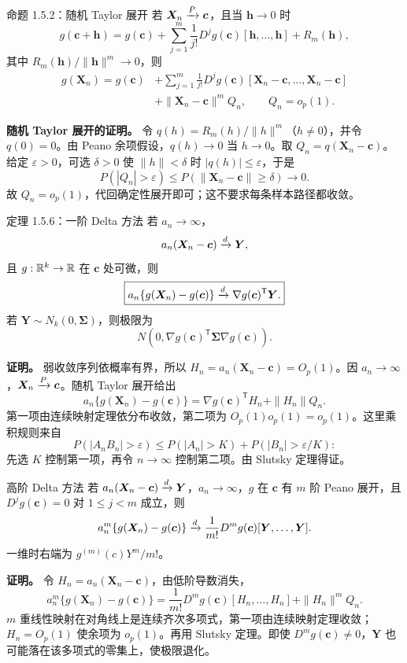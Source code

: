 \begin{definitionbox}{命题 1.5.2：随机 Taylor 展开}
若 $\bm X_n\xrightarrow{P}\bm c$，且当 $\bm h\to0$ 时
\[
 g(\bm c+\bm h)
 =g(\bm c)+\sum_{j=1}^m\frac1{j!}
 D^jg(\bm c)[\bm h,\ldots,\bm h]+R_m(\bm h),
\]
其中 $R_m(\bm h)/\|\bm h\|^m\to0$，则
\[
\begin{aligned}
 g(\bm X_n)=g(\bm c)
 &+\sum_{j=1}^m\frac1{j!}
 D^jg(\bm c)[\bm X_n-\bm c,\ldots,\bm X_n-\bm c]\\
 &+\|\bm X_n-\bm c\|^mQ_n,
 \qquad Q_n=o_p(1).
\end{aligned}
\]
\end{definitionbox}

\textbf{随机 Taylor 展开的证明。} 令 $q(h)=R_m(h)/\|h\|^m$（$h\ne0$），并令 $q(0)=0$。由 Peano 余项假设，$q(h)\to0$ 当 $h\to0$。取 $Q_n=q(\bm X_n-\bm c)$。给定 $\varepsilon>0$，可选 $\delta>0$ 使 $\|h\|<\delta$ 时 $|q(h)|\le\varepsilon$，于是
\[
 P(|Q_n|>\varepsilon)\le P(\|\bm X_n-\bm c\|\ge\delta)\to0.
\]
故 $Q_n=o_p(1)$，代回确定性展开即可；这不要求每条样本路径都收敛。

\begin{definitionbox}{定理 1.5.6：一阶 Delta 方法}
若 $a_n\to\infty$，
\[
 a_n(\bm X_n-\bm c)\xrightarrow{d}\bm Y,
\]
且 $g:\mathbb R^k\to\mathbb R$ 在 $\bm c$ 处可微，则
\[
 \boxed{
 a_n\{g(\bm X_n)-g(\bm c)\}
 \xrightarrow{d} \nabla g(\bm c)^{\mathsf T}\bm Y.}
\]
若 $\bm Y\sim N_k(0,\bm\Sigma)$，则极限为
\[
 N\!\left(0,
 \nabla g(\bm c)^{\mathsf T}
 \bm\Sigma
 \nabla g(\bm c)\right).
\]
\end{definitionbox}

\textbf{证明。} 弱收敛序列依概率有界，所以 $H_n=a_n(\bm X_n-\bm c)=O_p(1)$。因 $a_n\to\infty$，$\bm X_n\xrightarrow{P}\bm c$。随机 Taylor 展开给出
\[
 a_n\{g(\bm X_n)-g(\bm c)\}
 =\nabla g(\bm c)^{\mathsf T}H_n+\|H_n\|Q_n.
\]
第一项由连续映射定理依分布收敛，第二项为 $O_p(1)o_p(1)=o_p(1)$。这里乘积规则来自
\[
 P(|A_nB_n|>\varepsilon)\le P(|A_n|>K)+P(|B_n|>\varepsilon/K):
\]
先选 $K$ 控制第一项，再令 $n\to\infty$ 控制第二项。由 Slutsky 定理得证。

\begin{definitionbox}{高阶 Delta 方法}
若 $a_n(\bm X_n-\bm c)\xrightarrow{d}\bm Y$，$a_n\to\infty$，$g$ 在 $\bm c$ 有 $m$ 阶 Peano 展开，且 $D^jg(\bm c)=0$ 对 $1\le j<m$ 成立，则
\[
 a_n^m\{g(\bm X_n)-g(\bm c)\}
 \xrightarrow{d}\frac1{m!}D^mg(\bm c)[\bm Y,\ldots,\bm Y].
\]
一维时右端为 $g^{(m)}(c)Y^m/m!$。
\end{definitionbox}

\textbf{证明。} 令 $H_n=a_n(\bm X_n-\bm c)$，由低阶导数消失，
\[
 a_n^m\{g(\bm X_n)-g(\bm c)\}
 =\frac1{m!}D^mg(\bm c)[H_n,\ldots,H_n]+\|H_n\|^mQ_n.
\]
$m$ 重线性映射在对角线上是连续齐次多项式，第一项由连续映射定理收敛；$H_n=O_p(1)$ 使余项为 $o_p(1)$。再用 Slutsky 定理。即使 $D^mg(\bm c)\ne0$，$\bm Y$ 也可能落在该多项式的零集上，使极限退化。

